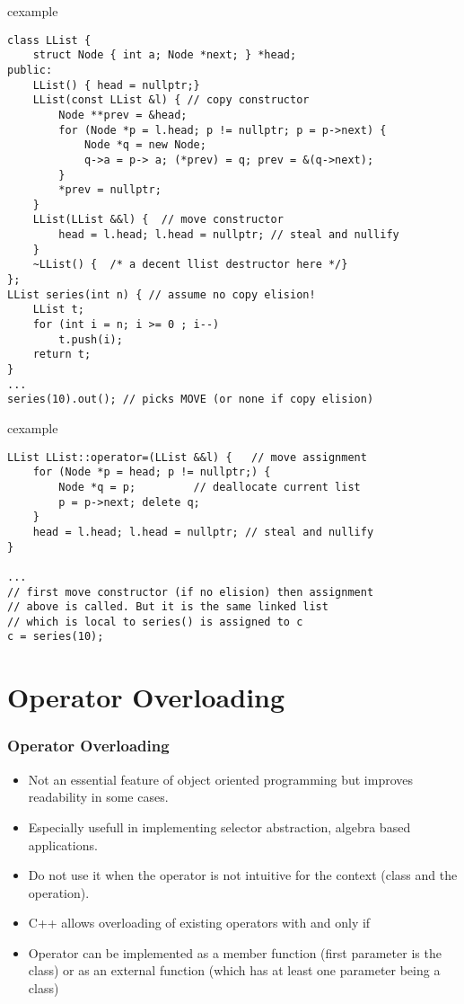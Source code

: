 \begin{frame}[fragile]
\begin{beamercolorbox}{cexample}
\begin{lstlisting}
class LList {
    struct Node { int a; Node *next; } *head;
public:
    LList() { head = nullptr;}
    LList(const LList &l) { // copy constructor
        Node **prev = &head;
        for (Node *p = l.head; p != nullptr; p = p->next) {
            Node *q = new Node;
            q->a = p-> a; (*prev) = q; prev = &(q->next);
        }
        *prev = nullptr;
    }
    LList(LList &&l) {  // move constructor
        head = l.head; l.head = nullptr; // steal and nullify
    }
    ~LList() {  /* a decent llist destructor here */}
};
LList series(int n) { // assume no copy elision!
    LList t;
    for (int i = n; i >= 0 ; i--)
        t.push(i);
    return t;
} 
...
series(10).out(); // picks MOVE (or none if copy elision)
\end{lstlisting}
\end{beamercolorbox}
\end{frame}

\begin{frame}[fragile]
\begin{beamercolorbox}{cexample}
\begin{lstlisting}
LList LList::operator=(LList &&l) {   // move assignment
    for (Node *p = head; p != nullptr;) { 
        Node *q = p;         // deallocate current list
        p = p->next; delete q;
    }   
    head = l.head; l.head = nullptr; // steal and nullify
}

...
// first move constructor (if no elision) then assignment 
// above is called. But it is the same linked list
// which is local to series() is assigned to c
c = series(10);  
\end{lstlisting}
\end{beamercolorbox}
\end{frame}

\section{Operator Overloading}
\begin{frame}
\frametitle{Operator Overloading}
\begin{itemize}[<+->]
\item Not an essential feature of object oriented programming but improves
readability in some cases.
\item Especially usefull in implementing selector abstraction, algebra
based applications.
\item \alert{Do not use it when the operator is not intuitive for the context
(class and the operation).}
\item C++ allows overloading of existing operators with  and only if 
\item Operator can be implemented as a member function 
(first parameter is the class) or as an external function
(which has at least one parameter being a class)
\end{itemize}
\end{frame}

